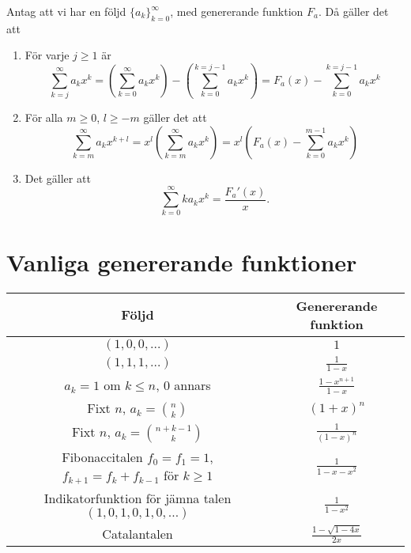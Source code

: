 \documentclass[nobib]{tufte-handout}
\begin{document}
\begin{lemma}
  Antag att vi har en följd $\{a_k\}_{k=0}^\infty$, med genererande funktion $F_a$. Då gäller det att
    \begin{enumerate}
        \item För varje $j \geq 1$ är
        $$\sum_{k = j}^{\infty} a_k x^k = \left(\sum_{k=0}^{\infty}a_k x^k\right) - \left(\sum_{k=0}^{k=j-1} a_kx^k\right) = F_a(x) - \sum_{k=0}^{k=j-1} a_kx^k$$
        \item För alla $m \geq 0$, $l \geq -m$ gäller det att
        $$\sum_{k=m}^{\infty} a_k x^{k + l} = x^l\left(\sum_{k=m}^{\infty} a_k x^{k}\right) = x^l\left(F_a(x) - \sum_{k=0}^{m-1} a_k x^k\right)$$
        \item Det gäller att
        $$\sum_{k=0}^{\infty} k a_k x^k = \frac{F_a'(x)}{x}.$$
    \end{enumerate}
\end{lemma}

\section{Vanliga genererande funktioner}

\begin{tabularx}{\linewidth}{cc}
  Följd & Genererande funktion\\
  \midrule
  $(1, 0, 0, \ldots)$ & $1$\\
  $(1,1,1,\ldots)$ & $\frac{1}{1-x}$\\
  $a_k = 1$ om $k \leq n$, $0$ annars & $\frac{1 - x^{n+1}}{1 - x}$\\
  Fixt $n$, $a_k = \binom{n}{k}$ & $(1+x)^n$\\
  Fixt $n$, $a_k = \binom{n+k-1}{k}$ & $\frac{1}{(1-x)^n}$\\
  \specialcell{Fibonaccitalen\\$f_0 = f_1 = 1$, $f_{k+1} = f_k + f_{k-1}$ för $k \geq 1$} & $\frac{1}{1 - x - x^2}$\\
  \specialcell{Indikatorfunktion för jämna talen\\$(1,0,1,0,1,0,\ldots)$} & $\frac{1}{1-x^2}$\\
  Catalantalen & $\frac{1 - \sqrt{1 - 4x}}{2x}$
\end{tabularx}
\end{document}
